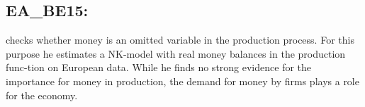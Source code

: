 \documentclass[11pt,a4paper]{article}
\begin{document}
\begin{itemize}
		
		
	\end{itemize}
	
	
	\subsection{EA\_BE15: \cite{benchimol2015money}}
	\label{EABE15}
	\cite{benchimol2015money} checks whether money is an omitted variable in the production process. For this purpose he estimates a NK-model with real money balances in the production func-tion on European data. While he finds no strong evidence for the importance for money in production, the demand for money by firms plays a role for the economy.
	
\end{document}
